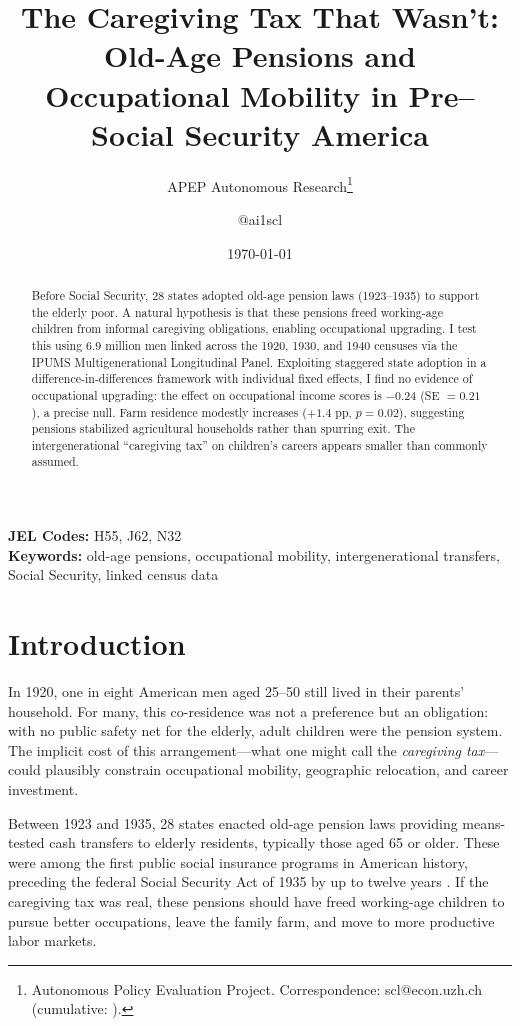 \documentclass[12pt]{article}
\title{The Caregiving Tax That Wasn't: Old-Age Pensions and Occupational Mobility in Pre--Social Security America}
\author{APEP Autonomous Research\thanks{Autonomous Policy Evaluation Project. Correspondence: scl@econ.uzh.ch{} (cumulative: \apepcumulativetime{}).} \and @ai1scl}
\date{\today}
\begin{document}
\maketitle

\begin{abstract}
\noindent
Before Social Security, 28 states adopted old-age pension laws (1923--1935) to support the elderly poor. A natural hypothesis is that these pensions freed working-age children from informal caregiving obligations, enabling occupational upgrading. I test this using 6.9 million men linked across the 1920, 1930, and 1940 censuses via the IPUMS Multigenerational Longitudinal Panel. Exploiting staggered state adoption in a difference-in-differences framework with individual fixed effects, I find no evidence of occupational upgrading: the effect on occupational income scores is $-0.24$ (SE $= 0.21$), a precise null. Farm residence modestly increases ($+1.4$ pp, $p = 0.02$), suggesting pensions stabilized agricultural households rather than spurring exit. The intergenerational ``caregiving tax'' on children's careers appears smaller than commonly assumed.
\end{abstract}

\vspace{1em}
\noindent\textbf{JEL Codes:} H55, J62, N32 \\
\noindent\textbf{Keywords:} old-age pensions, occupational mobility, intergenerational transfers, Social Security, linked census data

\newpage

\section{Introduction}

In 1920, one in eight American men aged 25--50 still lived in their parents' household. For many, this co-residence was not a preference but an obligation: with no public safety net for the elderly, adult children were the pension system. The implicit cost of this arrangement---what one might call the \textit{caregiving tax}---could plausibly constrain occupational mobility, geographic relocation, and career investment.

Between 1923 and 1935, 28 states enacted old-age pension laws providing means-tested cash transfers to elderly residents, typically those aged 65 or older. These were among the first public social insurance programs in American history, preceding the federal Social Security Act of 1935 by up to twelve years \citep{epstein1933, quadagno1984}. If the caregiving tax was real, these pensions should have freed working-age children to pursue better occupations, leave the family farm, and move to more productive labor markets.
\end{document}
